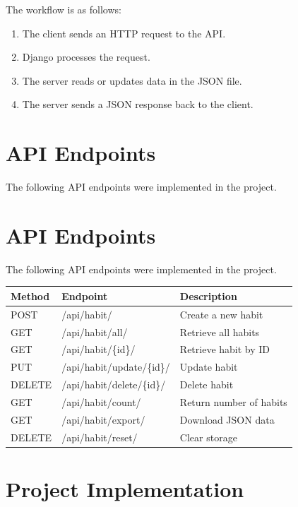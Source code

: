 \documentclass[12pt]{article}
\begin{document}
The workflow is as follows:

\begin{enumerate}

\item The client sends an HTTP request to the API.
\item Django processes the request.
\item The server reads or updates data in the JSON file.
\item The server sends a JSON response back to the client.

\end{enumerate}

\section{API Endpoints}

The following API endpoints were implemented in the project.

\section{API Endpoints}

The following API endpoints were implemented in the project.

\begin{center}
\begin{tabular}{|l|l|l|}
\hline
\textbf{Method} & \textbf{Endpoint} & \textbf{Description} \\
\hline
POST & /api/habit/ & Create a new habit \\
GET & /api/habit/all/ & Retrieve all habits \\
GET & /api/habit/\{id\}/ & Retrieve habit by ID \\
PUT & /api/habit/update/\{id\}/ & Update habit \\
DELETE & /api/habit/delete/\{id\}/ & Delete habit \\
GET & /api/habit/count/ & Return number of habits \\
GET & /api/habit/export/ & Download JSON data \\
DELETE & /api/habit/reset/ & Clear storage \\
\hline
\end{tabular}
\end{center}

\section{Project Implementation}
\end{document}
